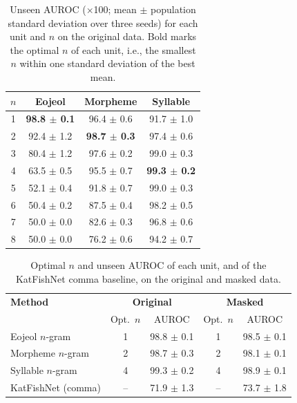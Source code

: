 
\begin{table}[t]
\centering
\small
\begin{tabular}{cccc}
\hline
$n$ & \textbf{Eojeol} & \textbf{Morpheme} & \textbf{Syllable} \\
\hline
1 & \textbf{98.8 $\pm$ 0.1} & 96.4 $\pm$ 0.6 & 91.7 $\pm$ 1.0 \\
2 & 92.4 $\pm$ 1.2 & \textbf{98.7 $\pm$ 0.3} & 97.4 $\pm$ 0.6 \\
3 & 80.4 $\pm$ 1.2 & 97.6 $\pm$ 0.2 & 99.0 $\pm$ 0.3 \\
4 & 63.5 $\pm$ 0.5 & 95.5 $\pm$ 0.7 & \textbf{99.3 $\pm$ 0.2} \\
5 & 52.1 $\pm$ 0.4 & 91.8 $\pm$ 0.7 & 99.0 $\pm$ 0.3 \\
6 & 50.4 $\pm$ 0.2 & 87.5 $\pm$ 0.4 & 98.2 $\pm$ 0.5 \\
7 & 50.0 $\pm$ 0.0 & 82.6 $\pm$ 0.3 & 96.8 $\pm$ 0.6 \\
8 & 50.0 $\pm$ 0.0 & 76.2 $\pm$ 0.6 & 94.2 $\pm$ 0.7 \\
\hline
\end{tabular}
\caption{Unseen AUROC ($\times$100; mean $\pm$ population standard deviation over three seeds) for each unit and $n$ on the original data. Bold marks the optimal $n$ of each unit, i.e., the smallest $n$ within one standard deviation of the best mean.}
\label{tab:main}
\end{table}

\begin{table}[t]
\centering
\small
\begin{tabular}{lcccc}
\hline
\textbf{Method} & \multicolumn{2}{c}{\textbf{Original}} & \multicolumn{2}{c}{\textbf{Masked}} \\
 & Opt.\ $n$ & AUROC & Opt.\ $n$ & AUROC \\
\hline
Eojeol $n$-gram & 1 & 98.8 $\pm$ 0.1 & 1 & 98.5 $\pm$ 0.1 \\
Morpheme $n$-gram & 2 & 98.7 $\pm$ 0.3 & 2 & 98.1 $\pm$ 0.1 \\
Syllable $n$-gram & 4 & 99.3 $\pm$ 0.2 & 4 & 98.9 $\pm$ 0.1 \\
KatFishNet (comma) & -- & 71.9 $\pm$ 1.3 & -- & 73.7 $\pm$ 1.8 \\
\hline
\end{tabular}
\caption{Optimal $n$ and unseen AUROC of each unit, and of the KatFishNet comma baseline, on the original and masked data.}
\label{tab:summary}
\end{table}

